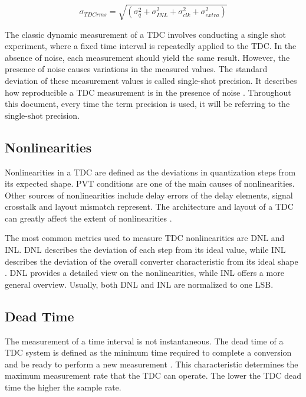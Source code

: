 \begin{equation}
\label{eq:precision}
	\sigma_{TDCrms} = \sqrt{(\sigma_{q}^2 + \sigma_{INL}^2 + \sigma_{clk}^2 + \sigma_{extra}^2)}
\end{equation}

The classic dynamic measurement of a \gls{TDC} involves conducting a single shot experiment, where a fixed time interval is repeatedly applied to the \gls{TDC}. In the absence of noise, each measurement should yield the same result. However, the presence of noise causes variations in the measured values. The standard deviation of these measurement values is called single-shot precision. It describes how reproducible a \gls{TDC} measurement is in the presence of noise \citep[Chap.~3]{henzler_book}. Throughout this document, every time the term precision is used, it will be referring to the single-shot precision.


\subsection{Nonlinearities} %
\label{sub:nonlinearities}

Nonlinearities in a \gls{TDC} are defined as the deviations in quantization steps from its expected shape. \gls{PVT} conditions are one of the main causes of nonlinearities. Other sources of nonlinearities include delay errors of the delay elements, signal crosstalk and layout mismatch represent. The architecture and layout of a \gls{TDC} can greatly affect the extent of nonlinearities \citep{cheng_ov}.

The most common metrics used to measure \gls{TDC} nonlinearities are \gls{DNL} and \acrlong{INL}. \Gls{DNL} describes the deviation of each step from its ideal value, while \gls{INL} describes the deviation of the overall converter characteristic from its ideal shape \citep[Chap.~3]{henzler_book}. \gls{DNL} provides a detailed view on the nonlinearities, while \gls{INL} offers a more general overview. Usually, both \gls{DNL} and \gls{INL} are normalized to one \gls{LSB}.


\subsection{Dead Time} %
\label{sub:dead_time}

The measurement of a time interval is not instantaneous. The dead time of a \gls{TDC} system is defined as the minimum time required to complete a conversion and be ready to perform a new measurement \citep{machado_ov}. This characteristic determines the maximum measurement rate that the \gls{TDC} can operate. The lower the \gls{TDC} dead time the higher the sample rate.

